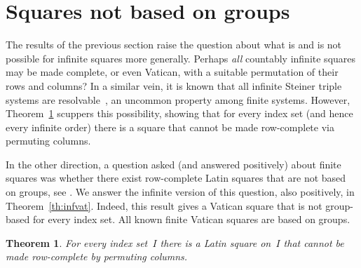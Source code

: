 \documentclass[12pt,a4paper]{article}
\newtheorem{thm}{Theorem}[section]
\begin{document}
\section{Squares not based on groups}\label{sec:notgp}



The results of the previous section raise the question about what is and is not possible for infinite squares more generally.   Perhaps {\em all} countably infinite squares may be made complete, or even Vatican, with a suitable permutation of their rows and columns?   In a similar vein, it is known that all infinite Steiner triple systems are resolvable~\cite{DHW14}, an uncommon property among finite systems. However, Theorem~\ref{th:notrcls} scuppers this possibility, showing that for every index set (and hence every infinite order) there is a square that cannot be made row-complete via permuting columns.

In the other direction, a question asked (and answered positively) about finite squares was whether there exist row-complete Latin squares that are not based on groups, see \cite{CE91, DK15, Owens76}.  We answer the infinite version of this question, also positively, in Theorem~\ref{th:infvat}.  Indeed, this result gives a Vatican square that is not group-based for every index set.   All known finite Vatican squares are based on groups.

\begin{thm}\label{th:notrcls}
For every index set~$I$ %
there is a Latin square on~$I$ that cannot be made row-complete by permuting columns.
\end{thm}
\end{document}

